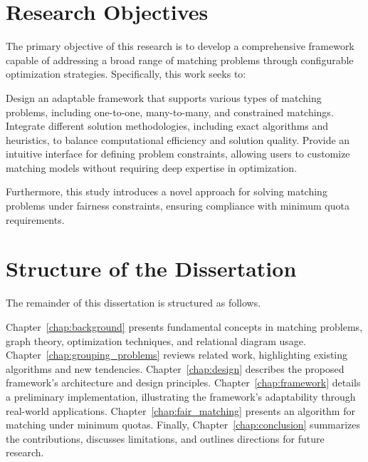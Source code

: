 \section{Research Objectives}
The primary objective of this research is to develop a comprehensive framework capable of addressing a broad range of matching problems through configurable optimization strategies. Specifically, this work seeks to:

Design an adaptable framework that supports various types of matching problems, including one-to-one, many-to-many, and constrained matchings.
Integrate different solution methodologies, including exact algorithms and heuristics, to balance computational efficiency and solution quality.
Provide an intuitive interface for defining problem constraints, allowing users to customize matching models without requiring deep expertise in optimization.

Furthermore, this study introduces a novel approach for solving matching problems under fairness constraints, ensuring compliance with minimum quota requirements.

\section{Structure of the Dissertation}
The remainder of this dissertation is structured as follows.

Chapter~\ref{chap:background} presents fundamental concepts in matching problems, graph theory, optimization techniques, and relational diagram usage.
Chapter~\ref{chap:grouping_problems} reviews related work, highlighting existing algorithms and new tendencies.
Chapter~\ref{chap:design} describes the proposed framework’s architecture and design principles.
Chapter~\ref{chap:framework} details a preliminary implementation, illustrating the framework’s adaptability through real-world applications.
Chapter~\ref{chap:fair_matching} presents an algorithm for matching under minimum quotas.
Finally, Chapter~\ref{chap:conclusion} summarizes the contributions, discusses limitations, and outlines directions for future research.